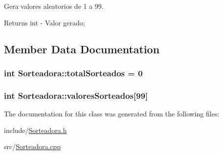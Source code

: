 Gera valores aleatorios de 1 a 99. 

\begin{DoxyReturn}{Returns}
int -\/ Valor gerado; 
\end{DoxyReturn}


\subsection{Member Data Documentation}
\subsubsection[{\texorpdfstring{total\+Sorteados}{totalSorteados}}]{\setlength{\rightskip}{0pt plus 5cm}int Sorteadora\+::total\+Sorteados = 0\hspace{0.3cm}{\ttfamily [static]}}\hypertarget{classSorteadora_afcff4e1cbf3c7f0e2fca896b4f6bc2c8}{}\label{classSorteadora_afcff4e1cbf3c7f0e2fca896b4f6bc2c8}
\subsubsection[{\texorpdfstring{valores\+Sorteados}{valoresSorteados}}]{\setlength{\rightskip}{0pt plus 5cm}int Sorteadora\+::valores\+Sorteados\mbox{[}99\mbox{]}}\hypertarget{classSorteadora_ab5b5e1f0dfa0544cf18f02bf5ba17c02}{}\label{classSorteadora_ab5b5e1f0dfa0544cf18f02bf5ba17c02}


The documentation for this class was generated from the following files\+:\begin{DoxyCompactItemize}
\item 
include/\hyperlink{Sorteadora_8h}{Sorteadora.\+h}\item 
src/\hyperlink{Sorteadora_8cpp}{Sorteadora.\+cpp}\end{DoxyCompactItemize}

